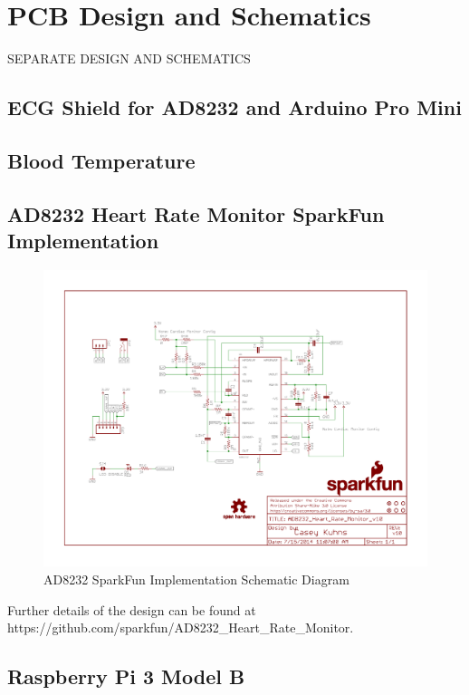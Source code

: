 \chapter{PCB Design and Schematics}

SEPARATE DESIGN AND SCHEMATICS

\section{ECG Shield for AD8232 and Arduino Pro Mini}
\label{ecgshieldpcb}

\section{Blood Temperature}

\section{AD8232 Heart Rate Monitor SparkFun Implementation}

\begin{figure}[H]
	\centering
	\includegraphics[width=1.05\linewidth]{AD8232_Heart_Rate_Monitor_v10.pdf}
	\caption{AD8232 SparkFun Implementation Schematic Diagram \cite{ad8232sfschematic}}
	\label{ad8232sfschematic}
\end{figure}

Further details of the design can be found at \\ https://github.com/sparkfun/AD8232\_Heart\_Rate\_Monitor.

\section{Raspberry Pi 3 Model B}

